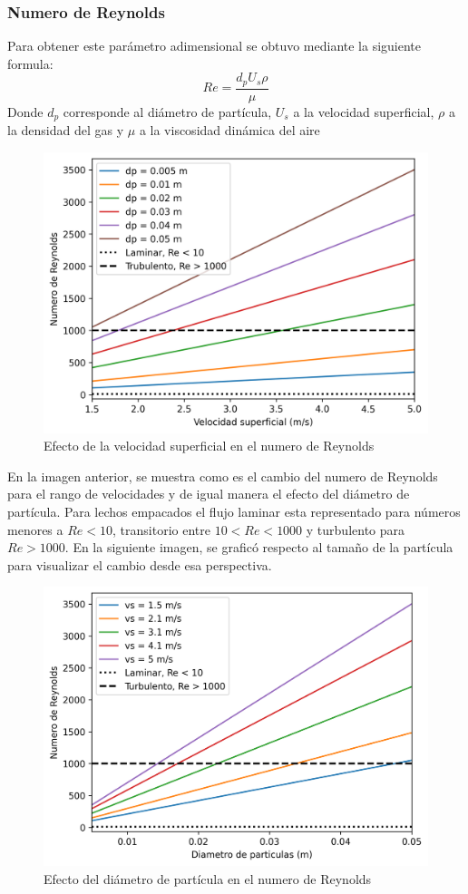 \documentclass[12pt,letterpaper,final]{article}%
\begin{document}
\subsubsection{Numero de Reynolds}
Para obtener este parámetro adimensional se obtuvo mediante la siguiente formula:
\begin{equation}\label{Ecu_reynolds}
	Re = \frac{d_p U_s \rho}{\mu}
\end{equation}
Donde $d_p$ corresponde al diámetro de partícula, $U_s$ a la velocidad superficial, $\rho$ a la densidad del gas y $\mu$ a la viscosidad dinámica del aire
\begin{figure}[ht!]\label{Reynolds_vs_Us}
	\centering
	\includegraphics[scale=.9]{RevsUs.png}
	\caption{Efecto de la velocidad superficial en el numero de Reynolds}
\end{figure}
\newline
En la imagen anterior, se muestra como es el cambio del numero de Reynolds para el rango de velocidades y de igual manera el efecto del diámetro de partícula. Para lechos empacados el flujo laminar esta representado para números menores a $Re<10$, transitorio entre $10<Re<1000$ y turbulento para $Re>1000$.
En la siguiente imagen, se graficó respecto al tamaño de la partícula para visualizar el cambio desde esa perspectiva. 
\begin{figure}[ht!]\label{Reynolds_vs_Dp}
	\centering
	\includegraphics[scale=0.9]{RevsDp.png}
	\caption{Efecto del diámetro de partícula en el numero de Reynolds}
\end{figure}
\end{document}
